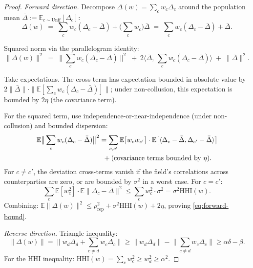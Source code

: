 \documentclass{article}
\newcommand{\HHI}{\mathrm{HHI}}
\begin{document}
\begin{proof}
\emph{Forward direction.}  Decompose
$\Delta(w) = \sum_c w_c \Delta_c$ around the population mean
$\bar\Delta := \mathbb{E}_{c \sim \mathrm{Unif}}[\Delta_c]$:
\[
  \Delta(w) \;=\; \sum_c w_c (\Delta_c - \bar\Delta)
              + \big(\textstyle\sum_c w_c\big) \bar\Delta
            \;=\; \sum_c w_c (\Delta_c - \bar\Delta) + \bar\Delta.
\]

Squared norm via the parallelogram identity:
\begin{equation*}
  \|\Delta(w)\|^2 \;=\; \big\|\sum_c w_c (\Delta_c - \bar\Delta)\big\|^2
   \;+\; 2 \big\langle \bar\Delta,\, \sum_c w_c (\Delta_c - \bar\Delta) \big\rangle
   \;+\; \|\bar\Delta\|^2.
\end{equation*}

Take expectations.  The cross term has expectation bounded in
absolute value by $2 \|\bar\Delta\| \cdot \|\mathbb{E}[\sum_c w_c
(\Delta_c - \bar\Delta)]\|$; under non-collusion, this expectation
is bounded by $2\eta$ (the covariance term).

For the squared term, use independence-or-near-independence (under
non-collusion) and bounded dispersion:
\begin{align*}
  \mathbb{E}\big\|\sum_c w_c (\Delta_c - \bar\Delta)\big\|^2
  &= \sum_{c, c'} \mathbb{E}\big[w_c w_{c'}\big] \cdot
    \mathbb{E}\big[\langle \Delta_c - \bar\Delta, \Delta_{c'} - \bar\Delta\rangle\big]
    \\ &\hspace{0.5em}+ (\text{covariance terms bounded by }\eta).
\end{align*}
For $c \neq c'$, the deviation cross-terms vanish if the field's
correlations across counterparties are zero, or are bounded by
$\sigma^2$ in a worst case.  For $c = c'$:
\[
  \sum_c \mathbb{E}[w_c^2] \cdot \mathbb{E}\|\Delta_c - \bar\Delta\|^2
  \leq \sum_c w_c^2 \cdot \sigma^2 = \sigma^2 \HHI(w).
\]
Combining: $\mathbb{E}\|\Delta(w)\|^2 \leq \rho_\mathrm{rep}^2 +
\sigma^2 \HHI(w) + 2\eta$, proving \eqref{eq:forward-bound}.

\emph{Reverse direction.}  Triangle inequality:
\[
  \|\Delta(w)\| = \big\| w_d \Delta_d + \sum_{c \neq d} w_c \Delta_c \big\|
  \geq \|w_d \Delta_d\| - \big\|\sum_{c \neq d} w_c \Delta_c\big\|
  \geq \alpha \delta - \beta.
\]
For the HHI inequality: $\HHI(w) = \sum_c w_c^2 \geq w_d^2 \geq
\alpha^2$.
\end{proof}
\end{document}
